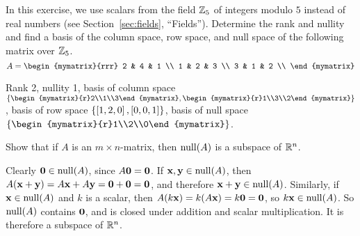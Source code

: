 \begin{ex}
  In this exercise, we use scalars from the field $\mathbb{Z}_5$ of integers
  modulo $5$ instead of real numbers (see Section~\ref{sec:fields},
  ``Fields'').  Determine the rank and nullity and find a basis of the
  column space, row space, and null space of the following matrix over
  $\mathbb{Z}_5$.
  \begin{equation*}
    A = \begin{mymatrix}{rrr}
      2 & 4 & 1 \\
      1 & 2 & 3 \\
      3 & 1 & 2 \\
    \end{mymatrix}
  \end{equation*}
  \begin{sol}
    Rank 2, nullity 1, basis of column space
    $\set{\begin{mymatrix}{r}2\\1\\3\end{mymatrix},
    \begin{mymatrix}{r}1\\3\\2\end{mymatrix}}$, basis of row space
    $\left\{\left[1,2,0\right], \left[0,0,1\right]\right\}$, basis of null space
    $\set{\begin{mymatrix}{r}1\\2\\0\end{mymatrix}}$.    
  \end{sol}
\end{ex}

\begin{ex}
  Show that if $A$ is an $m\times n$-matrix, then $\nullspace(A)$
  is a subspace of $\mathbb{R}^n$.
  \begin{sol}
    Clearly $\vect{0}\in\nullspace(A)$, since $A\vect{0}=\vect{0}$.
    If $\vect{x},\vect{y}\in\nullspace(A)$, then
    $A(\vect{x}+\vect{y}) = A\vect{x}+A\vect{y} = \vect{0}
    +\vect{0}=\vect{0}$, and therefore
    $\vect{x}+\vect{y}\in\nullspace(A)$. Similarly, if
    $\vect{x}\in\nullspace(A)$ and $k$ is a scalar, then
    $A(k\vect{x})=k(A\vect{x})=k\vect{0}=\vect{0}$, so
    $k\vect{x}\in\nullspace(A)$. So $\nullspace(A)$ contains
    $\vect{0}$, and is closed under addition and scalar
    multiplication. It is therefore a subspace of $\mathbb{R}^n$.
  \end{sol}
\end{ex}

